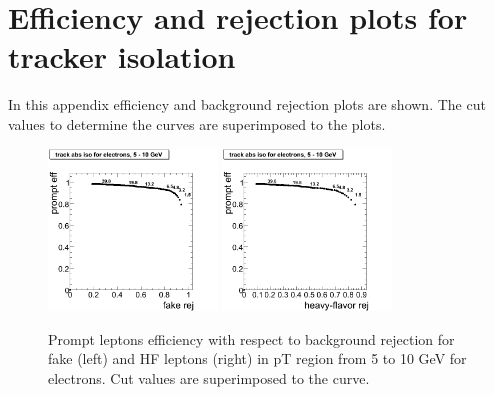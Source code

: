 \section{Efficiency and rejection plots for tracker isolation}
\label{app:plots_tk}
In this appendix efficiency and background rejection plots are shown. 
The cut values to determine the curves are superimposed to the plots.

\begin{figure}[htbp]
\begin{center}
 \includegraphics[width = 0.4\textwidth]{pictures/bkgdRej_sigEff/onlyTrack_elec_fake_ptCut0_ptCut1.png}
\includegraphics[width = 0.4\textwidth]{pictures/bkgdRej_sigEff/onlyTrack_elec_nonPrompt_ptCut0_ptCut1.png}
\caption{\small{Prompt leptons efficiency with respect to background 
rejection for fake (left) and HF leptons (right) in pT region
from 5 to 10 GeV for electrons. 
Cut values are superimposed to the curve.}\label{fig:rej_el1}}
\end{center}
\end{figure}

